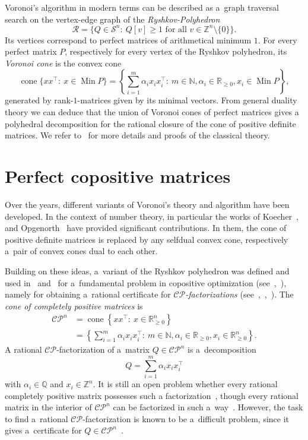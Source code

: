 \documentclass{commat}
\newcommand{\IZ}{{\mathbb{Z}}}
\newcommand{\IZn}{\IZ^n}
\newcommand{\IR}{{\mathbb{R}}}
\newcommand{\sR}{\mathcal{R}}
\DeclareMathOperator{\cone}{cone}
\newcommand{\sn}{{\mathcal{S}}^{n}}
\newcommand{\IZnmo}{\IZn\setminus\{0\}}
\newcommand{\IRngeo}{\IR_{\geq0}^n}
\newcommand{\IRgeo}{\IR_{\geq0}}
\newcommand{\cp}{{\mathcal{CP}}}
\newcommand{\cpn}{{\mathcal{CP}}^{n}}
\DeclareMathOperator{\Min}{Min}
\begin{document}
Voronoi's algorithm in modern terms can be described as a~graph traversal search on the
vertex-edge graph of the \emph{Ryshkov-Polyhedron}
\begin{equation}\label{eq:ryshkov-poly}
	\sR = \big\{ Q\in\sn :\ Q[v]\geq1 \text{ for all } v\in\IZnmo \big\}.
\end{equation}
Its vertices correspond to perfect matrices of arithmetical minimum $1$.
For every perfect matrix $P$, respectively for every vertex of the Ryshkov polyhedron,
its \emph{Voronoi cone} is the convex cone
\[
	\cone\big\{ xx^\intercal :\ x\in\Min P \big\}
	=\left\{ \sum_{i=1}^{m}\alpha_ix_ix_i^\intercal:\
        m\in\mathbb{N}, \alpha_i\in\IRgeo, x_i\in\Min P
     \right\},
\]
generated by rank-$1$-matrices given by its minimal vectors.
From general duality theory we can deduce that the union of Voronoi cones of perfect matrices gives
a polyhedral decomposition for the rational closure of the cone of positive definite matrices.
We refer to~\cite{schuermann-2009} for more details and proofs of the classical theory.


\section{Perfect copositive matrices}\label{sec:copositive}

Over the years, different variants of Voronoi's theory and algorithm have been developed.
In the context of number theory, in particular the works of
Koecher~\cite{koecher-1960},~\cite{koecher-1960a} and Opgenorth~\cite{opgenorth-2001} have provided
significant contributions.
In them, the cone of positive definite matrices is replaced by any selfdual convex cone,
respectively a~pair of convex cones dual to each other.

Building on these ideas, a~variant of the Ryshkov polyhedron was defined and used in~\cite{dsv-2017}
and~\cite{dsv-2021} for a~fundamental problem in copositive optimization
(see~\cite{bsu-2012},~\cite{duer-2010}), namely for obtaining a~rational certificate for
\emph{\(\cp \)-factorizations} (see~\cite{bs-2018},~\cite{gd-2020},~\cite{sdb-2018}).
The \emph{cone of completely positive matrices} is
\begin{align*}
	\cpn
	& = \cone\left\{ xx^\intercal :\ x\in\IRngeo \right\} \\
	& = \left\{ \sum_{i=1}^m \alpha_ix_ix_i^\intercal :\
			 m\in\mathbb{N},\alpha_i\in\IRgeo,x_i\in\IRngeo
		\right\}.
\end{align*}
A rational \(\cp \)-factorization of a~matrix \(Q\in\cpn \) is a~decomposition
\[
	Q = \sum_{i=1}^m \alpha_ix_ix_i^\intercal
\]
with \(\alpha_i\in\mathbb{Q} \) and \(x_i\in\IZn \).
It is still an open problem  whether every rational completely positive matrix possesses such a
factorization~\cite{bds-2015}, though every rational matrix in the interior of \(\cpn \)
can be factorized in such a~way~\cite{dsv-2017}.
However, the task to find a~rational \(\cp \)-factorization is known to be a~difficult
problem, since it gives a~certificate for \(Q\in\cpn \)~\cite{dg-2014}.
\end{document}
